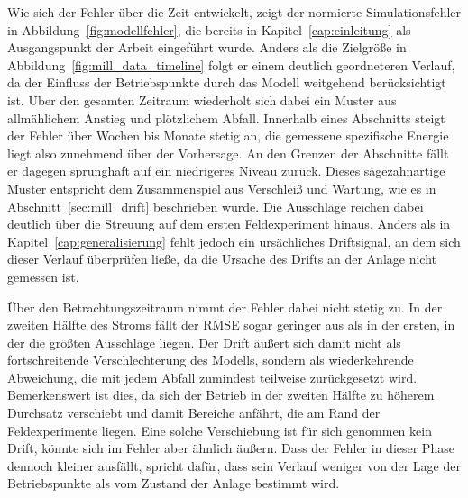 %
Wie sich der Fehler über die Zeit entwickelt, zeigt der normierte Simulationsfehler in Abbildung~\ref{fig:modellfehler}, die bereits in Kapitel~\ref{cap:einleitung} als Ausgangspunkt der Arbeit eingeführt wurde. Anders als die Zielgröße in Abbildung~\ref{fig:mill_data_timeline} folgt er einem deutlich geordneteren Verlauf, da der Einfluss der Betriebspunkte durch das Modell weitgehend berücksichtigt ist. Über den gesamten Zeitraum wiederholt sich dabei ein Muster aus allmählichem Anstieg und plötzlichem Abfall. Innerhalb eines Abschnitts steigt der Fehler über Wochen bis Monate stetig an, die gemessene spezifische Energie liegt also zunehmend über der Vorhersage. An den Grenzen der Abschnitte fällt er dagegen sprunghaft auf ein niedrigeres Niveau zurück. Dieses sägezahnartige Muster entspricht dem Zusammenspiel aus Verschleiß und Wartung, wie es in Abschnitt~\ref{sec:mill_drift} beschrieben wurde. Die Ausschläge reichen dabei deutlich über die Streuung auf dem ersten Feldexperiment hinaus. Anders als in Kapitel~\ref{cap:generalisierung} fehlt jedoch ein ursächliches Driftsignal, an dem sich dieser Verlauf überprüfen ließe, da die Ursache des Drifts an der Anlage nicht gemessen ist. \par
%
Über den Betrachtungszeitraum nimmt der Fehler dabei nicht stetig zu. In der zweiten Hälfte des Stroms fällt der \ac{RMSE} sogar geringer aus als in der ersten, in der die größten Ausschläge liegen. Der Drift äußert sich damit nicht als fortschreitende Verschlechterung des Modells, sondern als wiederkehrende Abweichung, die mit jedem Abfall zumindest teilweise zurückgesetzt wird. Bemerkenswert ist dies, da sich der Betrieb in der zweiten Hälfte zu höherem Durchsatz verschiebt und damit Bereiche anfährt, die am Rand der Feldexperimente liegen. Eine solche Verschiebung ist für sich genommen kein Drift, könnte sich im Fehler aber ähnlich äußern. Dass der Fehler in dieser Phase dennoch kleiner ausfällt, spricht dafür, dass sein Verlauf weniger von der Lage der Betriebspunkte als vom Zustand der Anlage bestimmt wird. \par
%

